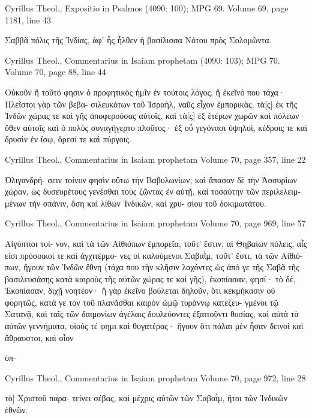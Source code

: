 \documentclass[12pt,letterpaper,twoside,final]{memoir}
\begin{document}
\begin{greek}
Cyrillus Theol., Expositio in Psalmos (4090: 100); MPG 69.
Volume 69, page 1181, line 43

                      Σαββᾶ πόλις τῆς Ἰνδίας, ἀφ' 
ἧς ἦλθεν ἡ βασίλισσα Νότου πρὸς Σολομῶντα. 



Cyrillus Theol., Commentarius in Isaiam prophetam (4090: 103); MPG 70.
Volume 70, page 88, line 44

Οὐκοῦν ἢ τοῦτό φησιν ὁ προφητικὸς ἡμῖν ἐν τούτοις 
λόγος, ἢ ἐκεῖνό που τάχα· Πλεῖστοι γὰρ τῶν βεβα-
σιλευκότων τοῦ Ἰσραὴλ, ναῦς εἶχον ἐμπορικὰς, τὰ[ς] 
ἐκ τῆς Ἰνδῶν χώρας τε καὶ γῆς ἀποφερούσας αὐτοῖς, 
καὶ τὰ[ς] ἐξ ἑτέρων χωρῶν καὶ πόλεων· ὅθεν αὐτοῖς 
καὶ ὁ πολὺς συναγήγερτο πλοῦτος· ἐξ οὗ γεγόνασι 
ὑψηλοὶ, κέδροις τε καὶ δρυσὶν ἐν ἴσῳ, ὄρεσί τε καὶ 
πύργοις. 



Cyrillus Theol., Commentarius in Isaiam prophetam 
Volume 70, page 357, line 22

                                        Ὀλιγανδρή-
σειν τοίνυν φησὶν οὕτω τὴν Βαβυλωνίων, καὶ ἅπασαν 
δὲ τὴν Ἀσσυρίων χώραν, ὡς δυσευρέτους γενέσθαι 
τοὺς ζῶντας ἐν αὐτῇ, καὶ τοσαύτην τῶν περιλελειμ-
μένων τὴν σπάνιν, ὅση καὶ λίθων Ἰνδικῶν, καὶ χρυ-
σίου τοῦ δοκιμωτάτου. 



Cyrillus Theol., Commentarius in Isaiam prophetam 
Volume 70, page 969, line 57

                                            Αἰγύπτιοι τοί-
νυν, καὶ τὰ τῶν Αἰθιόπων ἐμπορεῖα, τοῦτ' ἔστιν, αἱ 
Θηβαίων πόλεις, αἷς εἰσι πρόσοικοί τε καὶ ἀγχιτέρμο-
νες οἱ καλούμενοι Σαβαῒμ, τοῦτ' ἔστι, τὰ τῶν Αἰθιό-
πων, ἤγουν τῶν Ἰνδῶν ἔθνη (τάχα που τὴν κλῆσιν   
λαχόντες ὡς ἀπό γε τῆς Σαβᾶ τῆς βασιλευσάσης κατὰ 
καιροὺς τῆς αὐτῶν χώρας τε καὶ γῆς), ἐκοπίασαν, 
φησί· τὸ δὲ, Ἐκοπίασαν, διχῇ νοητέον· ἢ γὰρ ἐκεῖνο 
βούλεται δηλοῦν, ὅτι κεκμήκασιν οὐ φορητῶς, κατά 
γε τὸν τοῦ πλανᾶσθαι καιρὸν ὠμῷ τυράννῳ κατεζευ-
γμένοι τῷ Σατανᾷ, καὶ ταῖς τῶν δαιμονίων ἀγέλαις 
δουλεύοντες ἐξαιτοῦντι θυσίας, καὶ αὐτὰ τὰ αὐτῶν 
γεννήματα, υἱούς τέ φημι καὶ θυγατέρας· ἤγουν ὅτι 
πάλαι μὲν ἦσαν δεινοὶ καὶ ἄθραυστοι, καὶ οἷον

ὑπ-



Cyrillus Theol., Commentarius in Isaiam prophetam 
Volume 70, page 972, line 28

                                       τὸ] Χριστοῦ παρα-
τείνει σέβας, καὶ μέχρις αὐτῶν τῶν Σαβαῒμ, ἤτοι 
τῶν Ἰνδικῶν ἐθνῶν. 




\end{greek}
\end{document}
